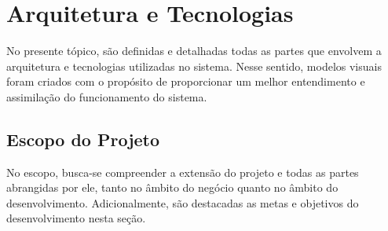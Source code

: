 \chapter{Arquitetura e Tecnologias}

No presente tópico, são definidas e detalhadas todas as partes que envolvem a arquitetura e tecnologias utilizadas no sistema. Nesse sentido, modelos visuais foram criados com o propósito de proporcionar um melhor entendimento e assimilação do funcionamento do sistema.

\section{Escopo do Projeto}

No escopo, busca-se compreender a extensão do projeto e todas as partes abrangidas por ele, tanto no âmbito do negócio quanto no âmbito do desenvolvimento. Adicionalmente, são destacadas as metas e objetivos do desenvolvimento nesta seção.




\pagebreak


\pagebreak


\pagebreak

















